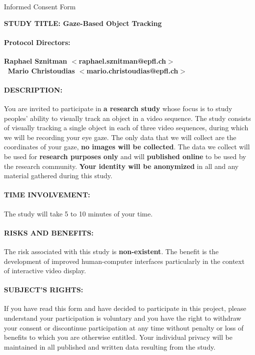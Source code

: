 \documentclass{article}[12pt]
\begin{document}
\pagestyle{empty}
\setlength{\parindent}{0cm}
\setlength{\parskip}{1em}

\begin{center} 
{\Large Informed Consent Form} 
\end{center}

{\bf STUDY TITLE: Gaze-Based Object Tracking}

\paragraph{Protocol Directors:} {\bf Raphael Sznitman $<$raphael.sznitman@epfl.ch$>$  \\
\mbox{ }\hspace{9em}Mario Christoudias $<$mario.christoudias@epfl.ch$>$}

\paragraph{DESCRIPTION:} You are invited to participate in {\bf a research study} whose focus is to study peoples' ability to visually track an object in a video sequence. The study consists of visually tracking a single object in each of three video sequences, during which we will be recording your eye gaze. The only data that we will collect are the coordinates of your gaze, {\bf no images will be collected}. The data we collect will be used for {\bf research purposes only} and will {\bf published online} to be used by the research community. {\bf Your identity will be anonymized} in all and any material gathered during this study.

\paragraph{TIME INVOLVEMENT:} The study will take 5 to 10 minutes of your time.

\paragraph{RISKS AND BENEFITS:} The risk associated with this study is {\bf non-existent}. The benefit is the development of improved human-computer interfaces particularly in the context of interactive video display.

\paragraph{SUBJECT'S RIGHTS:} If you have read this form and have decided to participate in this project, please understand your participation is voluntary and you have the right to withdraw your consent or discontinue participation at any time without penalty or loss of benefits to which you are otherwise entitled. Your individual privacy will be maintained in all published and written data resulting from the study.
\end{document}
